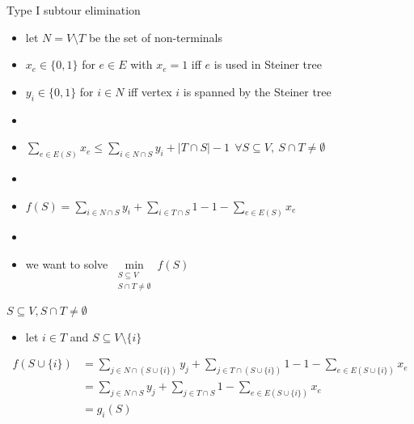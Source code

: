 \documentclass[usenames,dvipsnames]{beamer}
\begin{document}
\begin{frame}{Type I subtour elimination}
  \begin{itemize}
  \item let $N = V \setminus T$ be the set of non-terminals
  \item $x_e \in \{0,1\}$ for $e \in E$ with $x_e = 1$ iff  $e$ is used in Steiner tree
  \item $y_i \in \{0,1\}$ for $i \in N$ iff vertex $i$ is spanned by the Steiner tree
  \item[]
  \item $\sum\limits_{e \in E(S)} x_e \leq \sum\limits_{i \in N \cap S} y_i + |T \cap S| -1~~\forall S \subseteq V,~S \cap T \neq \emptyset$
  \item[]
  \item $f(S) =  \sum\limits_{i \in N \cap S} y_i + \sum\limits_{i \in T \cap S} 1 - 1 - \sum\limits_{e \in E(S)} x_e$
  \item[]
    \item we want to solve $\min\limits_{\substack{S \subseteq V\\S \cap T \neq \emptyset}} f(S)$
  \end{itemize}
\end{frame}



\begin{frame}{$S \subseteq V, S \cap T \neq \emptyset$}
  \begin{itemize}
  \item let $i \in T$ and $S \subseteq V \setminus \{i\}$
  \end{itemize}
  \begin{align*}f(S \cup \{i\}) &= \sum\limits_{j \in N \cap (S \cup \{i\})} y_j + \sum\limits_{j \in T \cap (S \cup \{i\})} 1 - 1 - \sum\limits_{e \in E(S \cup \{i\})} x_e \\
    &= \sum\limits_{j \in N \cap S} y_j + \sum\limits_{j \in T \cap S} 1 - \sum\limits_{e \in E(S \cup \{i\})} x_e \\
    &= g_i(S)
  \end{align*}
\end{frame}
\end{document}
